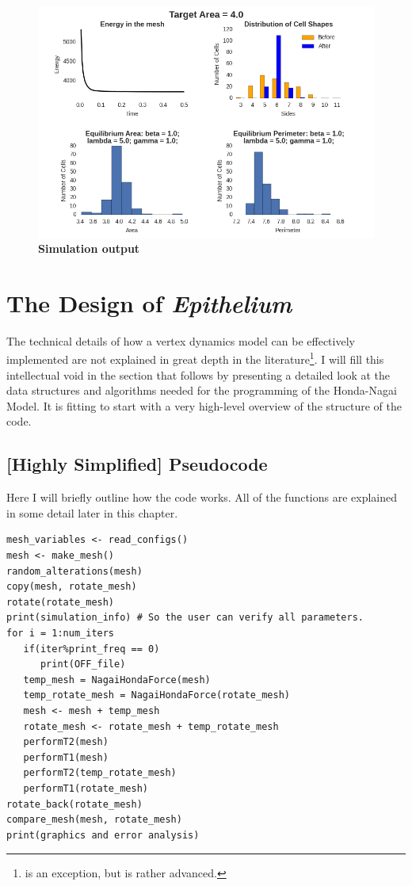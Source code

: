 \begin{figure}
\centering
\includegraphics[height=0.4\textheight]{../diagrams/graphs3.png}
\caption{\textbf{Simulation output}}
\label{fig:g3}
\end{figure}

\section{The Design of \emph{Epithelium}}
The technical details of how a vertex dynamics model can be effectively implemented are not explained in great depth in the literature\footnote{\cite{ChasteMain} is an exception, but is rather advanced.}. I will fill this intellectual void in the section that follows by presenting a detailed look at the data structures and algorithms needed for the programming of the Honda-Nagai Model. It is fitting to start with a very high-level overview of the structure of the code.

\subsection{[Highly Simplified] Pseudocode}
Here I will briefly outline how the code works. All of the functions are explained in some detail later in this chapter.
\begin{lstlisting}
mesh_variables <- read_configs()
mesh <- make_mesh()
random_alterations(mesh)
copy(mesh, rotate_mesh)
rotate(rotate_mesh)
print(simulation_info) # So the user can verify all parameters.
for i = 1:num_iters
   if(iter%print_freq == 0)
      print(OFF_file)
   temp_mesh = NagaiHondaForce(mesh) 
   temp_rotate_mesh = NagaiHondaForce(rotate_mesh)
   mesh <- mesh + temp_mesh
   rotate_mesh <- rotate_mesh + temp_rotate_mesh
   performT2(mesh)
   performT1(mesh)
   performT2(temp_rotate_mesh)
   performT1(rotate_mesh)
rotate_back(rotate_mesh)
compare_mesh(mesh, rotate_mesh)
print(graphics and error analysis)
\end{lstlisting}

